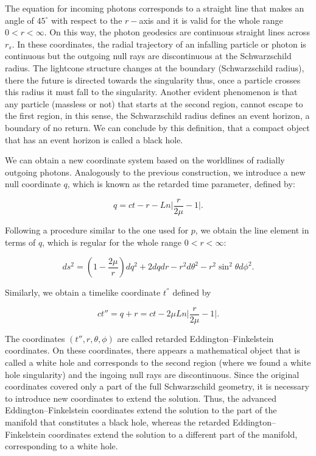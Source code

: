 \documentclass[letterpaper,11pt,onecolumn]{article}
\begin{document}
The equation for incoming photons corresponds to a straight line that makes an angle of $45^\circ$ with respect to the $r-$axis and it is valid for the whole range $0<r<\infty$. On this way, the photon geodesics are continuous straight lines across $r_s$. In these coordinates, the radial trajectory of an infalling particle or photon is continuous but the outgoing null rays are discontinuous at the Schwarzschild radius. The lightcone structure changes at the boundary (Schwarzschild radius), there the future is directed towards the singularity thus, once a particle crosses this radius it must fall to the singularity. Another evident phenomenon is that any particle (massless or not) that starts at the second region, cannot escape to the first region, in this sense, the Schwarzschild radius defines an event horizon, a boundary of no return. We can conclude by this definition, that a compact object that has an event horizon is called a black hole.

We can obtain a new coordinate system based on the worldlines of radially outgoing photons. Analogously to the previous construction, we introduce a new null coordinate $q$, which is known as the retarded time parameter, defined by:

\begin{equation}
    q= ct - r - Ln\Big| \frac{r}{2\mu}-1 \Big|.\label{46}
\end{equation}

Following a procedure similar to the one used for $p$, we obtain the line element in terms of $q$, which is regular for the whole range $0<r<\infty$:

\begin{equation}
ds^2 =\left( 1 - \frac{2\mu}{r}\right)dq^2+2dqdr- r^2 d\theta^2 - r^2 \sin^2 \theta d\phi^2. \label{5}
\end{equation}

Similarly, we obtain a timelike coordinate $t^{''}$ defined by

\begin{equation}
    ct''= q+r=ct-2\mu Ln\Big| \frac{r}{2\mu}-1 \Big|.\label{6}
\end{equation}

The coordinates $(t'',r,\theta,\phi)$ are called retarded Eddington–Finkelstein coordinates. On these coordinates, there appears a mathematical object that is called a white hole and corresponds to the second region (where we found a white hole singularity) and the ingoing null rays are discontinuous. Since the original coordinates covered only a part of the full Schwarzschild geometry, it is necessary to introduce new coordinates to extend the solution. Thus, the advanced Eddington–Finkelstein coordinates extend the solution to the part of the manifold that constitutes a black hole, whereas the retarded Eddington–Finkelstein coordinates extend the solution to a different part of the manifold, corresponding to a white hole. 
\end{document}
